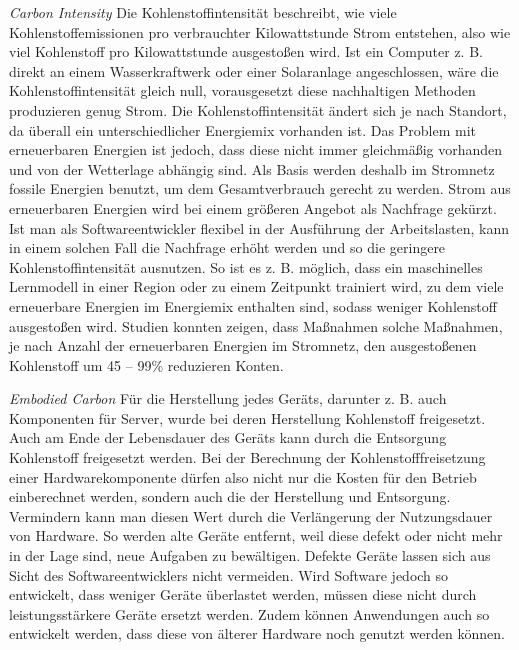 \documentclass[utf8,biblatex]{lni}
\begin{document}
\textit{Carbon Intensity} \newline
Die Kohlenstoffintensität beschreibt, wie viele Kohlenstoffemissionen pro verbrauchter Kilowattstunde Strom entstehen, also wie viel Kohlenstoff pro Kilowattstunde ausgestoßen wird. Ist ein Computer z. B. direkt an einem Wasserkraftwerk oder einer Solaranlage angeschlossen, wäre die Kohlenstoffintensität gleich null, vorausgesetzt diese nachhaltigen Methoden produzieren genug Strom. Die Kohlenstoffintensität ändert sich je nach Standort, da überall ein unterschiedlicher Energiemix vorhanden ist. Das Problem mit erneuerbaren Energien ist jedoch, dass diese nicht immer gleichmäßig vorhanden und von der Wetterlage abhängig sind. Als Basis werden deshalb im Stromnetz fossile Energien benutzt, um dem Gesamtverbrauch gerecht zu werden. Strom aus erneuerbaren Energien wird bei einem größeren Angebot als Nachfrage gekürzt. Ist man als Softwareentwickler flexibel in der Ausführung der Arbeitslasten, kann in einem solchen Fall die Nachfrage erhöht werden und so die geringere Kohlenstoffintensität ausnutzen. So ist es z. B. möglich, dass ein maschinelles Lernmodell in einer Region oder zu einem Zeitpunkt trainiert wird, zu dem viele erneuerbare Energien im Energiemix enthalten sind, sodass weniger Kohlenstoff ausgestoßen wird. Studien konnten zeigen, dass Maßnahmen solche Maßnahmen, je nach Anzahl der erneuerbaren Energien im Stromnetz, den ausgestoßenen Kohlenstoff um 45 – 99\% reduzieren Konten. \cite{Kelly11}

\textit{Embodied Carbon} \newline
Für die Herstellung jedes Geräts, darunter z. B. auch Komponenten für Server, wurde bei deren Herstellung Kohlenstoff freigesetzt. Auch am Ende der Lebensdauer des Geräts kann durch die Entsorgung Kohlenstoff freigesetzt werden. Bei der Berechnung der Kohlenstofffreisetzung einer Hardwarekomponente dürfen also nicht nur die Kosten für den Betrieb einberechnet werden, sondern auch die der Herstellung und Entsorgung. Vermindern kann man diesen Wert durch die Verlängerung der Nutzungsdauer von Hardware. So werden alte Geräte entfernt, weil diese defekt oder nicht mehr in der Lage sind, neue Aufgaben zu bewältigen. Defekte Geräte lassen sich aus Sicht des Softwareentwicklers nicht vermeiden. Wird Software jedoch so entwickelt, dass weniger Geräte überlastet werden, müssen diese nicht durch leistungsstärkere Geräte ersetzt werden. Zudem können Anwendungen auch so entwickelt werden, dass diese von älterer Hardware noch genutzt werden können.
\end{document}
